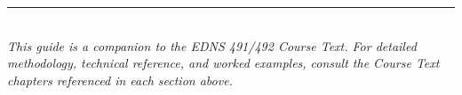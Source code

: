 \documentclass[11pt,letterpaper]{article}
\begin{document}
\vspace{1cm}
\begin{center}
\textcolor{minesgold}{\rule{0.5\textwidth}{1.5pt}}\\[8pt]
{\small\textit{This guide is a companion to the EDNS 491/492 Course Text. For detailed methodology, technical reference, and worked examples, consult the Course Text chapters referenced in each section above.}}
\end{center}
\end{document}
